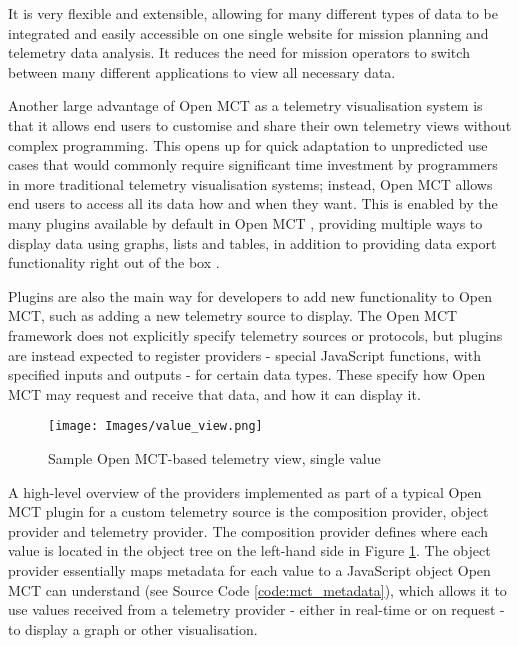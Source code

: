 It is very flexible and extensible, allowing for many different types of data to be integrated and easily accessible on one single website for mission planning and \gls{telemetry} data analysis. It reduces the need for mission operators to switch between many different applications to view all necessary data. \cite{dev_interview, mctos}

Another large advantage of Open MCT as a telemetry visualisation system is that it allows end users to customise and share their own telemetry views without complex programming. This opens up for quick adaptation to unpredicted use cases that would commonly require significant time investment by programmers in more traditional telemetry visualisation systems; instead, Open MCT allows end users to access all its data how and when they want. This is enabled by the many plugins available by default in Open MCT \cite{mctplugins}, providing multiple ways to display data using graphs, lists and tables, in addition to providing data export functionality right out of the box \cite{omct_intro}. 

Plugins are also the main way for developers to add new functionality to Open MCT, such as adding a new telemetry source to display. The Open MCT framework does not explicitly specify telemetry sources or protocols, but plugins are instead expected to register providers - special JavaScript functions, with specified inputs and outputs - for certain data types. These specify how Open MCT may request and receive that data, and how it can display it.

\begin{figure}[H]
    \centering
    \texttt{[image: Images/value\_view.png]}
    \caption{Sample Open MCT-based telemetry view, single value}
    \label{fig:omctvalue}
\end{figure}

A high-level overview of the providers implemented as part of a typical Open MCT plugin for a custom telemetry source is the composition provider, object provider and telemetry provider. The composition provider defines where each value is located in the object tree on the left-hand side in Figure \ref{fig:omctvalue}. The object provider essentially maps \gls{metadata} for each value to a JavaScript object Open MCT can understand (see Source Code \ref{code:mct_metadata}), which allows it to use values received from a telemetry provider - either in real-time or on request - to display a graph or other visualisation.


